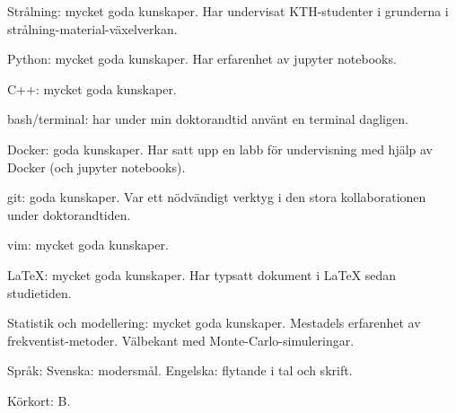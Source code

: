 



\begin{cvskills}

\cvskill
{Strålning:}
{mycket goda kunskaper. Har undervisat KTH-studenter i grunderna i strålning-material-växelverkan.}

\cvskill
{Python:}
{mycket goda kunskaper. Har erfarenhet av jupyter notebooks.}

\cvskill
{C++:}
{mycket goda kunskaper.}

\cvskill
{bash/terminal:}
{har under min doktorandtid anv{\"a}nt en terminal dagligen.}

\cvskill
{Docker:} 
{goda kunskaper. Har satt upp en labb f{\"o}r undervisning med hj{\"a}lp av Docker (och jupyter notebooks).}

\cvskill
{git:}
{goda kunskaper. Var ett n{\"o}dv{\"a}ndigt verktyg i den stora kollaborationen under doktorandtiden.}

\cvskill
{vim:}
{mycket goda kunskaper.}

\cvskill
{LaTeX:}
{mycket goda kunskaper. Har typsatt dokument i LaTeX sedan studietiden.}

\cvskill
{Statistik och} {}
\cvskill
{modellering:}
{mycket goda kunskaper. Mestadels erfarenhet av frekventist-metoder. V{\"a}lbekant med Monte-Carlo-simuleringar.}

\cvskill
{Spr{\aa}k:}
{Svenska: modersm{\aa}l. Engelska: flytande i tal och skrift.}

\cvskill
{Körkort:}
{B.}


\end{cvskills}